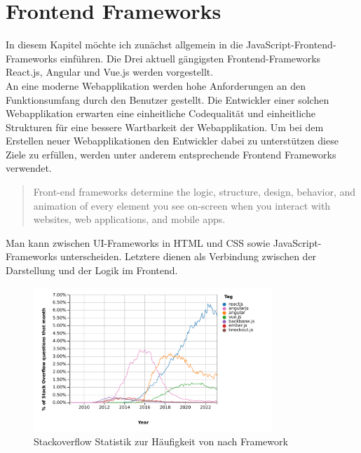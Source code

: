 %

\chapter{Frontend Frameworks}

In diesem Kapitel möchte ich zunächst allgemein in die JavaScript-Frontend-Frameworks einführen.
Die Drei aktuell gängigsten Frontend-Frameworks React.js, Angular und Vue.js werden vorgestellt.
\\
An eine moderne Webapplikation werden hohe Anforderungen an den Funktionsumfang durch den Benutzer gestellt.
Die Entwickler einer solchen Webapplikation erwarten eine einheitliche Codequalität und einheitliche Strukturen
für eine bessere Wartbarkeit der Webapplikation.
Um bei dem Erstellen neuer Webapplikationen den Entwickler dabei zu unterstützen diese Ziele zu erfüllen,
werden unter anderem entsprechende Frontend Frameworks verwendet.
\begin{quote}
    Front-end frameworks determine the logic, structure, design, behavior,
    and animation of every element you see on-screen when you interact with websites,
    web applications, and mobile apps. \cite{sigdestad22}
\end{quote}
Man kann zwischen UI-Frameworks in HTML und CSS sowie JavaScript-Frameworks unterscheiden.
Letztere dienen als Verbindung zwischen der Darstellung und der Logik im Frontend.

\begin{figure}[!htb]
    \centering
    \includegraphics[width=0.8\textwidth]{img/js_frameworks_statistic_stackoverflow}
    \caption{Stackoverflow Statistik zur Häufigkeit von nach Framework}
    \label{fig:stackoverflow_stat}
\end{figure}


